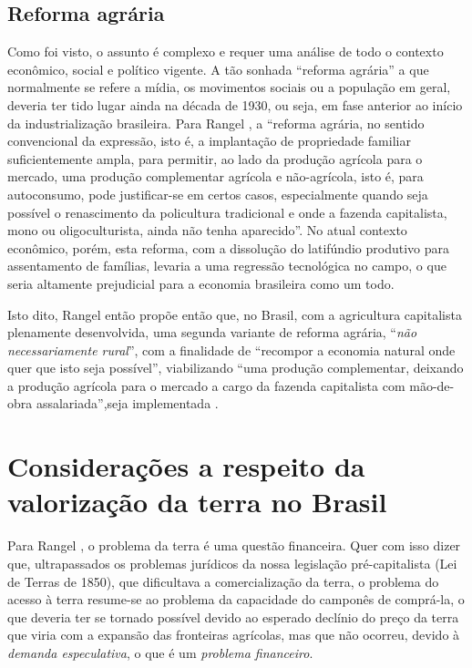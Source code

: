 \documentclass[
	12pt,				%
	oneside,			%
	a4paper,			%
	chapter=TITLE,		%
	section=TITLE,		%
	english,			%
	brazil				%
	]{abntex2}
\begin{document}
\subsection{Reforma agrária}\label{reforma-agruxe1ria}

Como foi visto, o assunto é complexo e requer uma análise de todo o
contexto econômico, social e político vigente. A tão sonhada ``reforma
agrária'' a que normalmente se refere a mídia, os movimentos sociais ou
a população em geral, deveria ter tido lugar ainda na década de 1930, ou
seja, em fase anterior ao início da industrialização brasileira. Para
Rangel \autocite[154]{rangel1986a}, a ``reforma agrária, no sentido
convencional da expressão, isto é, a implantação de propriedade familiar
suficientemente ampla, para permitir, ao lado da produção agrícola para
o mercado, uma produção complementar agrícola e não-agrícola, isto é,
para autoconsumo, pode justificar-se em certos casos, especialmente
quando seja possível o renascimento da policultura tradicional e onde a
fazenda capitalista, mono ou oligoculturista, ainda não tenha
aparecido''. No atual contexto econômico, porém, esta reforma, com a
dissolução do latifúndio produtivo para assentamento de famílias,
levaria a uma regressão tecnológica no campo, o que seria altamente
prejudicial para a economia brasileira como um todo.

Isto dito, Rangel então propõe então que, no Brasil, com a agricultura
capitalista plenamente desenvolvida, uma segunda variante de reforma
agrária, ``\emph{não necessariamente rural}'', com a finalidade de
``recompor a economia natural onde quer que isto seja possível'',
viabilizando ``uma produção complementar, deixando a produção agrícola
para o mercado a cargo da fazenda capitalista com mão-de-obra
assalariada'',seja implementada \autocite[155]{rangel1986a}.

\section{Considerações a respeito da valorização da terra no
Brasil}\label{considerauxe7uxf5es-a-respeito-da-valorizauxe7uxe3o-da-terra-no-brasil}

Para Rangel \autocite*[138-139]{rangel1986b}, o problema da terra é uma
questão financeira. Quer com isso dizer que, ultrapassados os problemas
jurídicos da nossa legislação pré-capitalista (Lei de Terras de 1850),
que dificultava a comercialização da terra, o problema do acesso à terra
resume-se ao problema da capacidade do camponês de comprá-la, o que
deveria ter se tornado possível devido ao esperado declínio do preço da
terra que viria com a expansão das fronteiras agrícolas, mas que não
ocorreu, devido à \emph{demanda especulativa}, o que é um \emph{problema
financeiro}.
\end{document}
